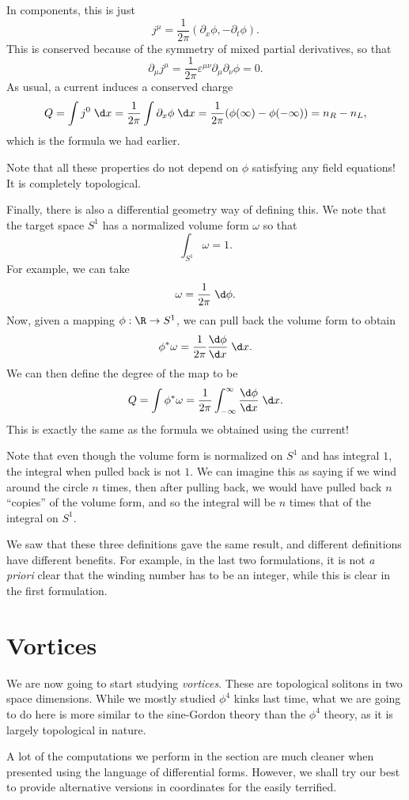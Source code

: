 \documentclass[a4paper]{article}
\begin{document}
In components, this is just
\[
  j^\mu = \frac{1}{2\pi} (\partial_x \phi, - \partial_t \phi).
\]
This is conserved because of the symmetry of mixed partial derivatives, so that
\[
  \partial_\mu j^\mu = \frac{1}{2\pi} \varepsilon^{\mu\nu} \partial_\mu \partial_\nu \phi = 0.
\]
As usual, a current induces a conserved charge
\[
  Q = \int j^0 \;\d x = \frac{1}{2\pi} \int \partial_x \phi \;\d x = \frac{1}{2\pi} (\phi(\infty) - \phi(-\infty)) = n_R - n_L,
\]
which is the formula we had earlier.

Note that all these properties do not depend on $\phi$ satisfying any field equations! It is completely topological.


Finally, there is also a differential geometry way of defining this. We note that the target space $S^1$ has a normalized volume form $\omega$ so that
\[
  \int_{S^1} \omega = 1.
\]
For example, we can take
\[
  \omega = \frac{1}{2\pi}\;\d \phi.
\]
Now, given a mapping $\phi: \R \to S^1$, we can pull back the volume form to obtain
\[
  \phi^* \omega = \frac{1}{2\pi} \frac{\d \phi}{\d x} \;\d x.
\]
We can then define the degree of the map to be
\[
  Q = \int \phi^* \omega = \frac{1}{2\pi}\int_{-\infty}^\infty \frac{\d \phi}{\d x}\;\d x.
\]
This is exactly the same as the formula we obtained using the current!

Note that even though the volume form is normalized on $S^1$ and has integral $1$, the integral when pulled back is not $1$. We can imagine this as saying if we wind around the circle $n$ times, then after pulling back, we would have pulled back $n$ ``copies'' of the volume form, and so the integral will be $n$ times that of the integral on $S^1$.

We saw that these three definitions gave the same result, and different definitions have different benefits. For example, in the last two formulations, it is not \emph{a priori} clear that the winding number has to be an integer, while this is clear in the first formulation.

\section{Vortices}
We are now going to start studying \emph{vortices}. These are topological solitons in two space dimensions. While we mostly studied $\phi^4$ kinks last time, what we are going to do here is more similar to the sine-Gordon theory than the $\phi^4$ theory, as it is largely topological in nature.

A lot of the computations we perform in the section are much cleaner when presented using the language of differential forms. However, we shall try our best to provide alternative versions in coordinates for the easily terrified.
\end{document}

